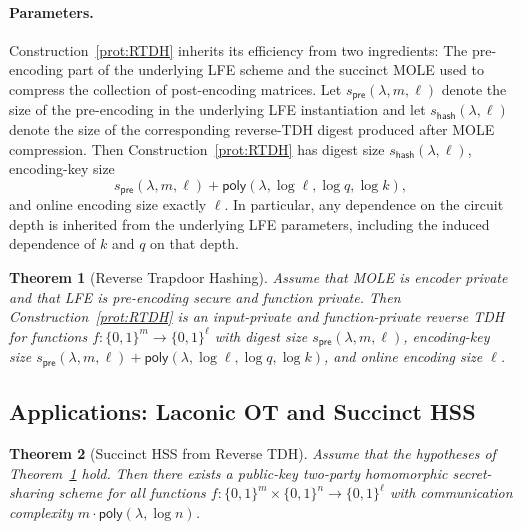 \documentclass{article}
\newtheorem{theorem}{Theorem}\newtheorem{lemma}[theorem]{Lemma}\newtheorem{proposition}[theorem]{Proposition}\newtheorem{corollary}[theorem]{Corollary}\newtheorem{definition}[theorem]{Definition}\newtheorem{claim}[theorem]{Claim}
\newcommand{\poly}{\mathsf{poly}}
\begin{document}
{\paragraph{Parameters.} Construction~\ref{prot:RTDH}
inherits its efficiency from two ingredients: The pre-encoding part of the
underlying LFE scheme and the succinct MOLE used to compress the collection of
post-encoding matrices. Let
$s_{\mathsf{pre}}(\lambda,m,\ell)$
denote the size of the pre-encoding in the underlying LFE instantiation and let
$s_{\mathsf{hash}}(\lambda,\ell)$
denote the size of the corresponding reverse-TDH digest produced after MOLE
compression. Then Construction~\ref{prot:RTDH} has digest size
$s_{\mathsf{hash}}(\lambda,\ell)$,
encoding-key size
\[
s_{\mathsf{pre}}(\lambda,m,\ell)
+\poly(\lambda,\log \ell,\log q,\log k),
\]
and online encoding size exactly $\ell$. In particular, any dependence on the circuit depth is inherited from the
underlying LFE parameters, including the induced dependence of $k$ and $q$ on
that depth.}

{

\begin{theorem}[Reverse Trapdoor Hashing]\label{thm:reverseTDH}
Assume that MOLE is encoder private and that LFE is pre-encoding secure and
function private. Then Construction~\ref{prot:RTDH} is an input-private
and function-private reverse TDH for functions
$f:\{0,1\}^m\to\{0,1\}^\ell$ with digest size $s_{\mathsf{pre}}(\lambda,m,\ell)$,
encoding-key size
$s_{\mathsf{pre}}(\lambda,m,\ell)
+\poly(\lambda,\log \ell,\log q,\log k)$,
and online encoding size $\ell$.
\end{theorem}}


{\subsection{Applications: Laconic OT and Succinct HSS}}


{\begin{theorem}[Succinct HSS from Reverse TDH]
Assume that the hypotheses of Theorem~\ref{thm:reverseTDH} hold.  Then there exists a
public-key two-party homomorphic secret-sharing scheme for all functions
$f : \{0,1\}^{m} \times \{0,1\}^{n} \to \{0,1\}^{\ell}$
with communication complexity $m \cdot \poly(\lambda,\log n)$.
\end{theorem}}
\end{document}
